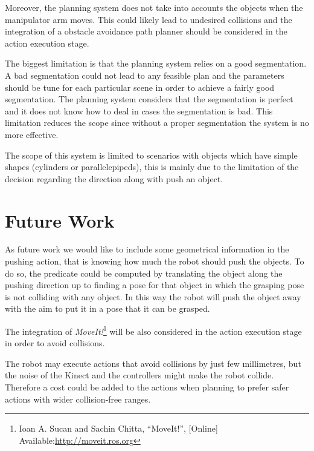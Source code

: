 Moreover, the planning system does not take into accounts the objects when the manipulator arm moves. This could likely lead to undesired collisions and the integration of a obstacle avoidance path planner should be considered in the action execution stage. 

The biggest limitation is that the planning system relies on a good segmentation. A bad segmentation could not lead to any feasible plan and the parameters should be tune for each particular scene in order to achieve a fairly good segmentation. The planning system considers that the segmentation is perfect and it does not know how to deal in cases the segmentation is bad. This limitation reduces the scope since without a proper segmentation the system is no more effective. 

The scope of this system is limited to scenarios with objects which have simple shapes (cylinders or parallelepipeds), this is mainly due to the limitation of the decision regarding the direction along with push an object.  


\section*{Future Work}
As future work we would like to include some geometrical information in the pushing action, that is knowing how much the robot should push the objects. To do so, the  predicate could be computed by translating the object along the pushing direction up to finding a pose for that object in which the grasping pose is not colliding with any object. In this way the robot will push the object away with the aim to put it in a pose that it can be grasped.

The integration of \textit{MoveIt!}\footnote{Ioan A. Sucan and Sachin Chitta, “MoveIt!”, [Online] Available:\href{http://moveit.ros.org} {\url{http://moveit.ros.org}}} will be also considered in the action execution stage in order to avoid collisions. 

The robot may execute actions that avoid collisions by just few millimetres, but the noise of the Kinect and the controllers might make the robot collide. Therefore a cost could be added to the actions when planning to prefer safer actions with wider collision-free ranges.